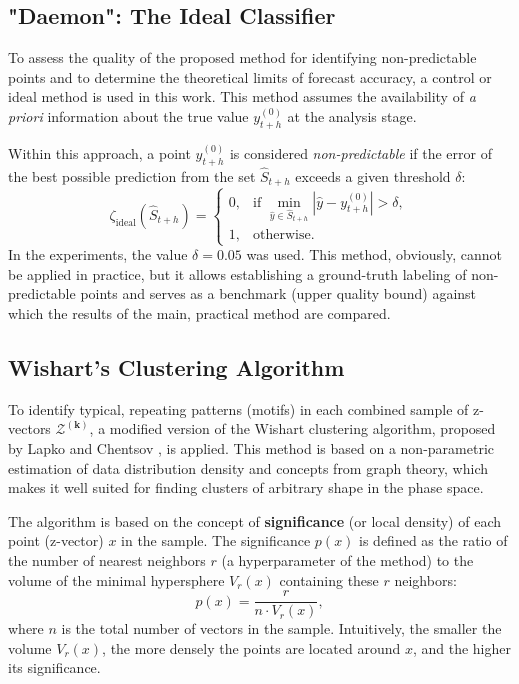 \documentclass[a4paper,12pt]{extarticle}
\begin{document}
\subsection{"Daemon": The Ideal Classifier}

To assess the quality of the proposed method for identifying non-predictable points and to
determine the theoretical limits of forecast accuracy, a
control or ideal method is used in this work. This method assumes the availability of \textit{a priori}
 information about the true value $y_{t+h}^{(0)}$ at the analysis stage.

Within this approach, a point $y_{t+h}^{(0)}$ is considered \textit{non-predictable}
 if the error of the best possible prediction from the set $\hat{S}_{t+h}$ exceeds a given threshold $\delta$:
\[
\zeta_{\text{ideal}}(\hat{S}_{t+h}) =
\begin{cases}
0, & \text{if } \min_{\hat{y} \in \hat{S}_{t+h}} |\hat{y} - y_{t+h}^{(0)}| > \delta, \\
1, & \text{otherwise.}
\end{cases}
\]
In the experiments, the value $\delta = 0.05$ was used. This method,
 obviously, cannot be applied in practice, but it allows establishing a ground-truth
  labeling of non-predictable points and serves as a benchmark (upper quality bound)
   against which the results of the main, practical method are compared.
\subsection{Wishart's Clustering Algorithm}

To identify typical, repeating patterns (motifs) in each
combined sample of z-vectors $\mathcal{Z}^{(\boldsymbol{k})}$, a
 modified version of the Wishart clustering algorithm, proposed by Lapko
 and Chentsov \cite{GromovBaranov2023}, is applied. This method is based on a non-parametric estimation of
 data distribution density and concepts from graph theory, which makes it well
 suited for finding clusters of arbitrary shape in the phase space.

The algorithm is based on the concept of \textbf{significance} (or local density)
 of each point (z-vector) $x$ in the sample. The significance $p(x)$ is defined as
 the ratio of the number of nearest neighbors $r$ (a hyperparameter of the method) to the volume of the minimal
  hypersphere $V_r(x)$ containing these $r$ neighbors:
\begin{equation}
p(x) = \frac{r}{n \cdot V_r(x)},
\end{equation}
where $n$ is the total number of vectors in the sample. Intuitively, the smaller the volume $V_r(x)$,
the more densely the points are located around $x$, and the higher its significance.
\end{document}
